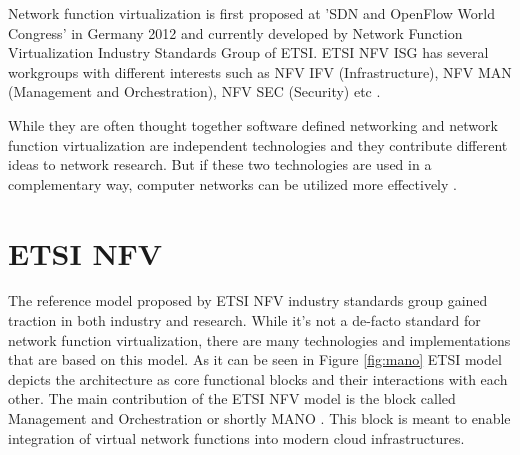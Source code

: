 \documentclass[12pt,oneandhalf,chaparabic,ceng,ms,eng,oneside,pntc]{gsufbe}
\begin{document}
Network function virtualization is first proposed at 'SDN and OpenFlow World Congress' in
Germany 2012 and currently developed by Network Function Virtualization Industry Standards Group of
ETSI.  ETSI NFV ISG has several workgroups with different interests such as NFV IFV (Infrastructure),
NFV MAN (Management and Orchestration), NFV SEC (Security) etc \cite{ntt_nfv}.

While they are often thought together software defined networking and network function virtualization
are independent technologies and they contribute different ideas to network research.  But if these two
technologies are used in a complementary way, computer networks can be utilized more effectively
\cite{gray_network_2016}.

\section{ETSI NFV}
The reference model \cite{etsi_nfv} proposed by ETSI NFV industry standards group gained traction
in both industry and
research.  While it's not a de-facto standard for network function virtualization, there are many
technologies and implementations that are based on this model.  As it can be seen in Figure \ref{fig:mano}
ETSI model depicts the architecture as core functional blocks and their interactions with each other.  
The main contribution of the ETSI NFV model is the block called Management and Orchestration or shortly
MANO \cite{etsi_nfvman}.  This block is meant to enable integration of virtual network functions 
into modern cloud
infrastructures.
\end{document}
